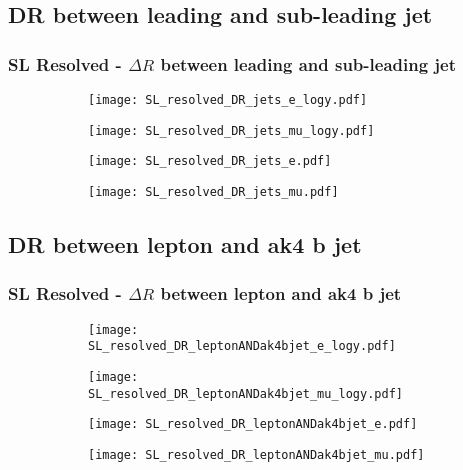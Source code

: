 \documentclass[aspectratio=169,8pt]{beamer}
\begin{document}
\subsection{DR between leading and sub-leading jet}
\begin{frame}
\frametitle{SL Resolved - $\Delta R$ between leading and sub-leading jet}
\begin{figure}
\captionsetup[subfigure]{labelformat=empty}
\begin{subfigure}{0.375\textwidth}
\texttt{[image: SL\_resolved\_DR\_jets\_e\_logy.pdf]}
\vspace*{-0.15cm}
\end{subfigure}
\hfil
\begin{subfigure}{0.375\textwidth}
\texttt{[image: SL\_resolved\_DR\_jets\_mu\_logy.pdf]}
\vspace*{-0.15cm}
\end{subfigure}
\hfil
\begin{subfigure}{0.375\textwidth}
\texttt{[image: SL\_resolved\_DR\_jets\_e.pdf]}
\vspace*{-0.15cm}
\end{subfigure}
\hfil
\begin{subfigure}{0.375\textwidth}
\texttt{[image: SL\_resolved\_DR\_jets\_mu.pdf]}
\vspace*{-0.15cm}
\end{subfigure}
\hfil
\end{figure}
\end{frame}
\newpage

\subsection{DR between  lepton and ak4 b jet}
\begin{frame}
\frametitle{SL Resolved - $\Delta R$ between  lepton and ak4 b jet}
\begin{figure}
\captionsetup[subfigure]{labelformat=empty}
\begin{subfigure}{0.375\textwidth}
\texttt{[image: SL\_resolved\_DR\_leptonANDak4bjet\_e\_logy.pdf]}
\vspace*{-0.15cm}
\end{subfigure}
\hfil
\begin{subfigure}{0.375\textwidth}
\texttt{[image: SL\_resolved\_DR\_leptonANDak4bjet\_mu\_logy.pdf]}
\vspace*{-0.15cm}
\end{subfigure}
\hfil
\begin{subfigure}{0.375\textwidth}
\texttt{[image: SL\_resolved\_DR\_leptonANDak4bjet\_e.pdf]}
\vspace*{-0.15cm}
\end{subfigure}
\hfil
\begin{subfigure}{0.375\textwidth}
\texttt{[image: SL\_resolved\_DR\_leptonANDak4bjet\_mu.pdf]}
\vspace*{-0.15cm}
\end{subfigure}
\hfil
\end{figure}
\end{frame}
\newpage
\end{document}
